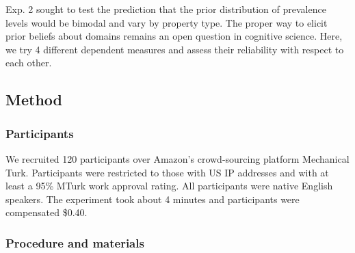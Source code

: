 \documentclass[10pt,letterpaper]{article}
\begin{document}
%        
%        


Exp. 2 sought to test the prediction that the prior distribution of prevalence levels would be bimodal and vary by property type. The proper way to elicit prior beliefs about domains remains an open question in cognitive science. Here, we try 4 different dependent measures and assess their reliability with respect to each other.

\subsection{Method}

\subsubsection{Participants}

We recruited 120 participants over Amazon's crowd-sourcing platform Mechanical Turk. Participants were restricted to those with US IP addresses and with at least a 95\% MTurk work approval rating. All participants were native English speakers. The experiment took about 4 minutes and participants were compensated \$0.40.


\subsubsection{Procedure and materials}
\end{document}
